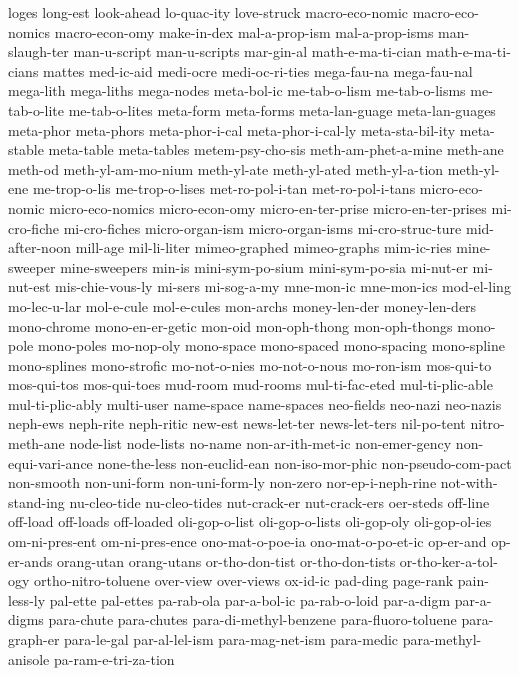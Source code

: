 {loges
long-est
look-ahead
lo-quac-ity
love-struck
macro-eco-nomic
macro-eco-nomics
macro-econ-omy
make-in-dex
mal-a-prop-ism
mal-a-prop-isms
man-slaugh-ter
man-u-script
man-u-scripts
mar-gin-al
math-e-ma-ti-cian
math-e-ma-ti-cians
mattes
med-ic-aid
medi-ocre
medi-oc-ri-ties
mega-fau-na
mega-fau-nal
mega-lith
mega-liths
mega-nodes
meta-bol-ic
me-tab-o-lism
me-tab-o-lisms
me-tab-o-lite
me-tab-o-lites
meta-form
meta-forms
meta-lan-guage
meta-lan-guages
meta-phor
meta-phors
meta-phor-i-cal
meta-phor-i-cal-ly
meta-sta-bil-ity
meta-stable
meta-table
meta-tables
metem-psy-cho-sis
meth-am-phet-a-mine
meth-ane
meth-od
meth-yl-am-mo-nium
meth-yl-ate
meth-yl-ated
meth-yl-a-tion
meth-yl-ene
me-trop-o-lis
me-trop-o-lises
met-ro-pol-i-tan
met-ro-pol-i-tans
micro-eco-nomic
micro-eco-nomics
micro-econ-omy
micro-en-ter-prise
micro-en-ter-prises
mi-cro-fiche
mi-cro-fiches
micro-organ-ism
micro-organ-isms
mi-cro-struc-ture
mid-after-noon
mill-age
mil-li-liter
mimeo-graphed
mimeo-graphs
mim-ic-ries
mine-sweeper
mine-sweepers
min-is
mini-sym-po-sium
mini-sym-po-sia
mi-nut-er
mi-nut-est
mis-chie-vous-ly
mi-sers
mi-sog-a-my
mne-mon-ic
mne-mon-ics
mod-el-ling
mo-lec-u-lar
mol-e-cule
mol-e-cules
mon-archs
money-len-der
money-len-ders
mono-chrome
mono-en-er-getic
mon-oid
mon-oph-thong
mon-oph-thongs
mono-pole
mono-poles
mo-nop-oly
mono-space
mono-spaced
mono-spacing
mono-spline
mono-splines
mono-strofic
mo-not-o-nies
mo-not-o-nous
mo-ron-ism
mos-qui-to
mos-qui-tos
mos-qui-toes
mud-room
mud-rooms
mul-ti-fac-eted
mul-ti-plic-able
mul-ti-plic-ably
multi-user
name-space
name-spaces
neo-fields
neo-nazi
neo-nazis
neph-ews
neph-rite
neph-ritic
new-est
news-let-ter
news-let-ters
nil-po-tent
nitro-meth-ane
node-list
node-lists
no-name
non-ar-ith-met-ic
non-emer-gency
non-equi-vari-ance
none-the-less
non-euclid-ean
non-iso-mor-phic
non-pseudo-com-pact
non-smooth
non-uni-form
non-uni-form-ly
non-zero
nor-ep-i-neph-rine
not-with-stand-ing
nu-cleo-tide
nu-cleo-tides
nut-crack-er
nut-crack-ers
oer-steds
off-line
off-load
off-loads
off-loaded
oli-gop-o-list
oli-gop-o-lists
oli-gop-oly
oli-gop-ol-ies
om-ni-pres-ent
om-ni-pres-ence
ono-mat-o-poe-ia
ono-mat-o-po-et-ic
op-er-and
op-er-ands
orang-utan
orang-utans
or-tho-don-tist
or-tho-don-tists
or-tho-ker-a-tol-ogy
ortho-nitro-toluene
over-view
over-views
ox-id-ic
pad-ding
page-rank
pain-less-ly
pal-ette
pal-ettes
pa-rab-ola
par-a-bol-ic
pa-rab-o-loid
par-a-digm
par-a-digms
para-chute
para-chutes
para-di-methyl-benzene
para-fluoro-toluene
para-graph-er
para-le-gal
par-al-lel-ism
para-mag-net-ism
para-medic
para-methyl-anisole
pa-ram-e-tri-za-tion
}
